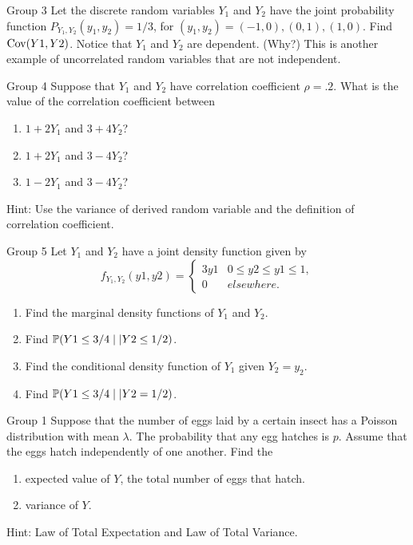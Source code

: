 \documentclass{article}
\begin{document}
\begin{problem}
    {Group 3}
    Let the discrete random variables $Y_1$ and $Y_2$ have the joint probability function $P_{Y_1,Y_2}(y_1, y_2) = 1/3$, for $(y_1, y_2) = (-1, 0), (0, 1), (1, 0)$. Find $\mathop{\mathrm{Cov}}\nolimits(Y1, Y2)$. Notice that $Y_1$ and $Y_2$ are dependent. (Why?) This is another example of uncorrelated random variables that are not independent.
\end{problem}

\begin{problem}
    {Group 4}
    Suppose that $Y_1$ and $Y_2$ have correlation coefficient $\rho = .2$. What is the value of the correlation coefficient between
    \begin{enumerate}
        \item $1 + 2Y_1$ and $3 + 4Y_2$?
        \item $1 + 2Y_1$ and $3 - 4Y_2$?
        \item $1 - 2Y_1$ and $3 - 4Y_2$?
    \end{enumerate}
    \begin{solution}
        {Hint:}
        Use the variance of derived random variable and the definition of correlation coefficient.
    \end{solution}
\end{problem}

\begin{problem}
    {Group 5}
    Let $Y_1$ and $Y_2$ have a joint density function given by
    \[
        f_{Y_1,Y_2} (y1, y2) = {
            \begin{cases}
                3y1 & 0 \leq y2 \leq y1 \leq 1,\\
                0 & elsewhere.
            \end{cases}
        }
    \]
    \begin{enumerate}
        \item Find the marginal density functions of $Y_1$ and $Y_2$.
        \item Find $\condP{Y1 \leq 3/4}{|Y2 \leq 1/2}$.
        \item Find the conditional density function of $Y_1$ given $Y_2 = y_2$.
        \item Find $\condP{Y1 \leq 3/4}{|Y2 = 1/2}$.
    \end{enumerate}
\end{problem}
\iffalse
\begin{problem}
    {Group 1}
    Suppose that the number of eggs laid by a certain insect has a Poisson distribution with mean $\lambda$. The probability that any egg hatches is $p$. Assume that the eggs hatch independently of one another. Find the
    \begin{enumerate}
        \item expected value of $Y$, the total number of eggs that hatch.
        \item variance of $Y$.
    \end{enumerate}
    \begin{solution}
        {Hint:}
        Law of Total Expectation and Law of Total Variance.
    \end{solution}
\end{problem}
\end{document}
